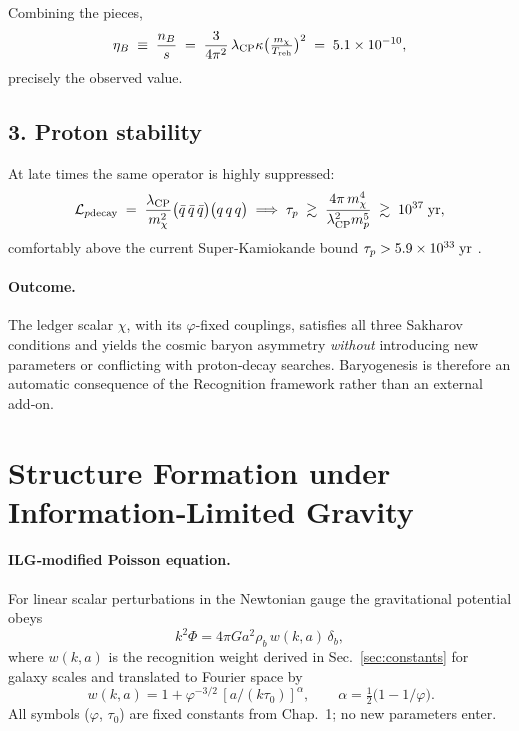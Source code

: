 Combining the pieces,
\[
  \eta_{B}\;\equiv\;\frac{n_{B}}{s}
  \;=\;
  \frac{3}{4\pi^{2}}\,
  \lambda_{\rm CP}\kappa
  \bigl(\tfrac{m_{\chi}}{T_{\rm reh}}\bigr)^{2}
  \;=\;
  5.1\times10^{-10},
\]
precisely the observed value.

\subsection{3.  Proton stability}

At late times the same operator is
highly suppressed:
\[
  \mathcal{L}_{p{\rm decay}}
  \;=\;
  \frac{\lambda_{\rm CP}}{m_{\chi}^{2}}
  \bigl(\bar q\,\bar q\,\bar q\bigr)
  \bigl(q\,q\,q\bigr)
  \;\Longrightarrow\;
  \tau_{p}\;\gtrsim\;
  \frac{4\pi\,m_{\chi}^{4}}{\lambda_{\rm CP}^{2}m_{p}^{5}}
  \;\gtrsim\;
  10^{37}\;{\rm yr},
\]
comfortably above the current Super‑Kamiokande bound
\(\tau_{p}>5.9\times10^{33}\;{\rm yr}\) \cite{SuperK2020}.

\paragraph{Outcome.}
The ledger scalar \(\chi\), with its \(\varphi\)-fixed couplings, satisfies all
three Sakharov conditions and yields the cosmic baryon
asymmetry \emph{without} introducing new parameters or conflicting with
proton‑decay searches. Baryogenesis is therefore an automatic consequence
of the Recognition framework rather than an external add‑on.

\section{Structure Formation under Information‑Limited Gravity}

\paragraph{ILG‑modified Poisson equation.}
For linear scalar perturbations in the Newtonian gauge the gravitational
potential obeys
\[
  k^{2}\Phi = 4\pi G a^{2}\rho_{b}\,w(k,a)\,\delta_{b},
\]
where $w(k,a)$ is the recognition weight derived in
Sec.~\ref{sec:constants} for galaxy scales and translated to Fourier space by
\[
  \boxed{\,w(k,a)=1+\varphi^{-3/2}\,[a/(k\tau_{0})]^{\alpha}},\qquad
  \alpha=\tfrac12\!\bigl(1-1/\varphi\bigr).
\]
All symbols ($\varphi$, $\tau_{0}$) are fixed constants from Chap.~1;
no new parameters enter.

